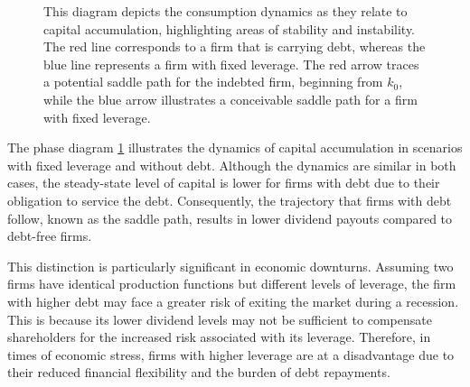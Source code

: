 \documentclass[12pt]{article}
\begin{document}
\begin{figure}
    \caption{This diagram depicts the consumption dynamics as they relate to capital accumulation, highlighting areas of
    stability and instability. The red line corresponds to a firm that is carrying debt, whereas the blue line
    represents a firm with fixed leverage. The red arrow traces a potential saddle path for the indebted firm, beginning
    from \( k_0 \), while
     the blue arrow illustrates a conceivable saddle path for a firm with fixed  leverage.} 
    \label{pl_phase_b}
\end{figure}
The phase diagram \ref{pl_phase_b} illustrates the dynamics of capital accumulation in scenarios with
fixed leverage and without debt. Although the dynamics are similar in both cases, the steady-state level of capital is
lower for firms with debt due to their obligation to service the debt. Consequently, the trajectory that firms with debt
follow, known as the saddle path, results in lower dividend payouts compared to debt-free firms. 

This distinction is particularly significant in economic downturns. Assuming two firms have identical production
functions but different levels of leverage, the firm with higher debt may face a greater risk of exiting the market
during a recession. This is because its lower dividend levels may not be sufficient to compensate shareholders for the
increased risk associated with its leverage. Therefore, in times of economic stress, firms with higher leverage are at a
disadvantage due to their reduced financial flexibility and the burden of debt repayments. 
\end{document}
